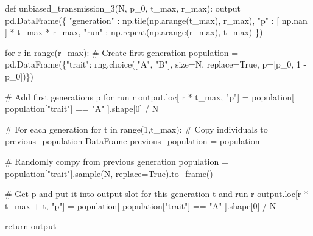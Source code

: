 \documentclass[
  a4paperpaper,
  ,captions=tableheading
]{scrbook}
\newenvironment{Shaded}{\begin{snugshade}}{\end{snugshade}}
\newcommand{\BuiltInTok}[1]{\textcolor[rgb]{0.00,0.23,0.31}{#1}}
\newcommand{\CommentTok}[1]{\textcolor[rgb]{0.37,0.37,0.37}{#1}}
\newcommand{\ControlFlowTok}[1]{\textcolor[rgb]{0.00,0.23,0.31}{#1}}
\newcommand{\DecValTok}[1]{\textcolor[rgb]{0.68,0.00,0.00}{#1}}
\newcommand{\KeywordTok}[1]{\textcolor[rgb]{0.00,0.23,0.31}{#1}}
\newcommand{\NormalTok}[1]{\textcolor[rgb]{0.00,0.23,0.31}{#1}}
\newcommand{\OperatorTok}[1]{\textcolor[rgb]{0.37,0.37,0.37}{#1}}
\newcommand{\StringTok}[1]{\textcolor[rgb]{0.13,0.47,0.30}{#1}}
\newcommand{\VariableTok}[1]{\textcolor[rgb]{0.07,0.07,0.07}{#1}}
\begin{document}
\begin{Shaded}
\begin{Highlighting}[]
\KeywordTok{def}\NormalTok{ unbiased\_transmission\_3(N, p\_0, t\_max, r\_max):}
\NormalTok{    output }\OperatorTok{=}\NormalTok{ pd.DataFrame(\{}
        \StringTok{"generation"}\NormalTok{ : np.tile(np.arange(t\_max), r\_max),}
        \StringTok{"p"}\NormalTok{ : [ np.nan ] }\OperatorTok{*}\NormalTok{ t\_max }\OperatorTok{*}\NormalTok{ r\_max,}
        \StringTok{"run"}\NormalTok{ : np.repeat(np.arange(r\_max), t\_max)}
\NormalTok{    \})}

    \ControlFlowTok{for}\NormalTok{ r }\KeywordTok{in} \BuiltInTok{range}\NormalTok{(r\_max):}
        \CommentTok{\# Create first generation}
\NormalTok{        population }\OperatorTok{=}\NormalTok{ pd.DataFrame(\{}\StringTok{"trait"}\NormalTok{: rng.choice([}\StringTok{"A"}\NormalTok{, }\StringTok{"B"}\NormalTok{], size}\OperatorTok{=}\NormalTok{N, replace}\OperatorTok{=}\VariableTok{True}\NormalTok{, p}\OperatorTok{=}\NormalTok{[p\_0, }\DecValTok{1} \OperatorTok{{-}}\NormalTok{ p\_0])\})}

        \CommentTok{\# Add first generation\textquotesingle{}s p for run r}
\NormalTok{        output.loc[ r }\OperatorTok{*}\NormalTok{ t\_max, }\StringTok{"p"}\NormalTok{] }\OperatorTok{=}\NormalTok{ population[ population[}\StringTok{"trait"}\NormalTok{] }\OperatorTok{==} \StringTok{"A"}\NormalTok{ ].shape[}\DecValTok{0}\NormalTok{] }\OperatorTok{/}\NormalTok{ N}

        \CommentTok{\# For each generation }
        \ControlFlowTok{for}\NormalTok{ t }\KeywordTok{in} \BuiltInTok{range}\NormalTok{(}\DecValTok{1}\NormalTok{,t\_max):}
            \CommentTok{\# Copy individuals to previous\_population DataFrame}
\NormalTok{            previous\_population }\OperatorTok{=}\NormalTok{ population}

            \CommentTok{\# Randomly compy from previous generation }
\NormalTok{            population }\OperatorTok{=}\NormalTok{ population[}\StringTok{"trait"}\NormalTok{].sample(N, replace}\OperatorTok{=}\VariableTok{True}\NormalTok{).to\_frame()}

            \CommentTok{\# Get p and put it into output slot for this generation t and run r}
\NormalTok{            output.loc[r }\OperatorTok{*}\NormalTok{ t\_max }\OperatorTok{+}\NormalTok{ t, }\StringTok{"p"}\NormalTok{] }\OperatorTok{=}\NormalTok{ population[ population[}\StringTok{"trait"}\NormalTok{] }\OperatorTok{==} \StringTok{"A"}\NormalTok{ ].shape[}\DecValTok{0}\NormalTok{] }\OperatorTok{/}\NormalTok{ N}

    \ControlFlowTok{return}\NormalTok{ output}
\end{Highlighting}
\end{Shaded}
\end{document}

